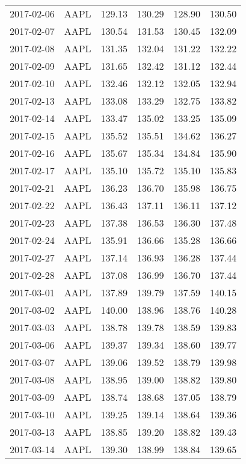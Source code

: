 \documentclass[12pt,a4paper]{report}
\begin{document}
\begin{appendices}
\begin{longtable}{llllll}
  2017-02-06 & AAPL & 129.13 & 130.29 & 128.90 & 130.50 \\ 
  2017-02-07 & AAPL & 130.54 & 131.53 & 130.45 & 132.09 \\ 
  2017-02-08 & AAPL & 131.35 & 132.04 & 131.22 & 132.22 \\ 
  2017-02-09 & AAPL & 131.65 & 132.42 & 131.12 & 132.44 \\ 
  2017-02-10 & AAPL & 132.46 & 132.12 & 132.05 & 132.94 \\ 
  2017-02-13 & AAPL & 133.08 & 133.29 & 132.75 & 133.82 \\ 
  2017-02-14 & AAPL & 133.47 & 135.02 & 133.25 & 135.09 \\ 
  2017-02-15 & AAPL & 135.52 & 135.51 & 134.62 & 136.27 \\ 
  2017-02-16 & AAPL & 135.67 & 135.34 & 134.84 & 135.90 \\ 
  2017-02-17 & AAPL & 135.10 & 135.72 & 135.10 & 135.83 \\ 
  2017-02-21 & AAPL & 136.23 & 136.70 & 135.98 & 136.75 \\ 
  2017-02-22 & AAPL & 136.43 & 137.11 & 136.11 & 137.12 \\ 
  2017-02-23 & AAPL & 137.38 & 136.53 & 136.30 & 137.48 \\ 
  2017-02-24 & AAPL & 135.91 & 136.66 & 135.28 & 136.66 \\ 
  2017-02-27 & AAPL & 137.14 & 136.93 & 136.28 & 137.44 \\ 
  2017-02-28 & AAPL & 137.08 & 136.99 & 136.70 & 137.44 \\ 
  2017-03-01 & AAPL & 137.89 & 139.79 & 137.59 & 140.15 \\ 
  2017-03-02 & AAPL & 140.00 & 138.96 & 138.76 & 140.28 \\ 
  2017-03-03 & AAPL & 138.78 & 139.78 & 138.59 & 139.83 \\ 
  2017-03-06 & AAPL & 139.37 & 139.34 & 138.60 & 139.77 \\ 
  2017-03-07 & AAPL & 139.06 & 139.52 & 138.79 & 139.98 \\ 
  2017-03-08 & AAPL & 138.95 & 139.00 & 138.82 & 139.80 \\ 
  2017-03-09 & AAPL & 138.74 & 138.68 & 137.05 & 138.79 \\ 
  2017-03-10 & AAPL & 139.25 & 139.14 & 138.64 & 139.36 \\ 
  2017-03-13 & AAPL & 138.85 & 139.20 & 138.82 & 139.43 \\ 
  2017-03-14 & AAPL & 139.30 & 138.99 & 138.84 & 139.65 \\ 

\end{longtable}
\end{appendices}
\end{document}
